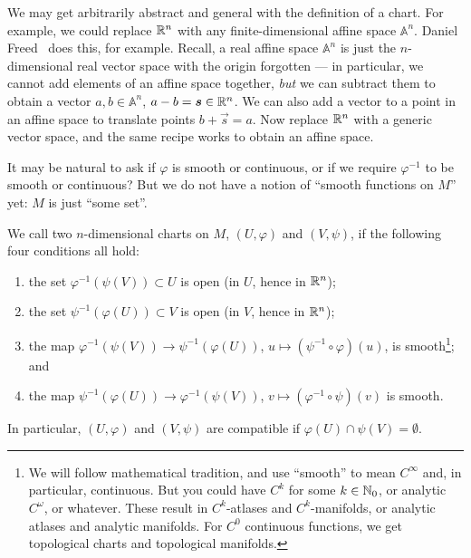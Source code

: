 \begin{remark}
We may get arbitrarily abstract and general with the definition of a
chart. For example, we could replace $\mathbb{R}^{n}$ with any
finite-dimensional affine space
$\mathbb{A}^{n}$. Daniel Freed~\cite{freed2022:notes} does this, for example.
Recall, a real affine space $\mathbb{A}^{n}$ is just the $n$-dimensional
real vector space with the origin forgotten --- in particular, we cannot
add elements of an affine space together, \emph{but} we can subtract
them to obtain a vector $a,b\in\mathbb{A}^{n}$, $a-b=\boldsymbol{s}\in\mathbb{R}^{n}$.
We can also add a vector to a point in an affine space to translate
points $b+\vec{s}=a$. Now replace $\mathbb{R}^{n}$ with a generic vector space,
and the same recipe works to obtain an affine space.
\end{remark}

\begin{remark}
It may be natural to ask if $\varphi$ is smooth or continuous, or if
we require $\varphi^{-1}$ to be smooth or continuous? But we do not have
a notion of ``smooth functions on $M$'' yet: $M$ is just ``some set''.
\end{remark}

\begin{definition}
We call two $n$-dimensional charts on $M$, $(U,\varphi)$ and $(V,\psi)$,
 if the following four conditions all hold:
\begin{enumerate}
\item the set $\varphi^{-1}\left(\psi(V)\right)\subset U$ is open (in
  $U$, hence in $\mathbb{R}^{n}$);
\item the set $\psi^{-1}\left(\varphi(U)\right)\subset V$ is open (in $V$,
  hence in $\mathbb{R}^{n}$);
\item\label{property:chart-compatible:transition-fun1} the map $\varphi^{-1}\left(\psi(V)\right)\to\psi^{-1}\left(\varphi(U)\right)$,
$u\mapsto(\psi^{-1}\circ\varphi)(u)$, is smooth\footnote{We will follow
mathematical tradition, and use ``smooth'' to mean $C^{\infty}$ and, in
particular, continuous. But you could have $C^{k}$ for some
$k\in\mathbb{N}_{0}$, or analytic $C^{\omega}$, or whatever. These result in
$C^{k}$-atlases and $C^{k}$-manifolds, or analytic atlases and analytic
manifolds. For $C^{0}$ continuous functions, we get topological charts
and topological manifolds.}; and
\item\label{property:chart-compatible:transition-fun2} the map $\psi^{-1}\left(\varphi(U)\right)\to\varphi^{-1}\left(\psi(V)\right)$,
$v\mapsto(\varphi^{-1}\circ\psi)(v)$ is smooth.
\end{enumerate}
In particular, $(U,\varphi)$ and $(V,\psi)$ are compatible if $\varphi(U)\cap\psi(V)=\emptyset$.
\end{definition}

